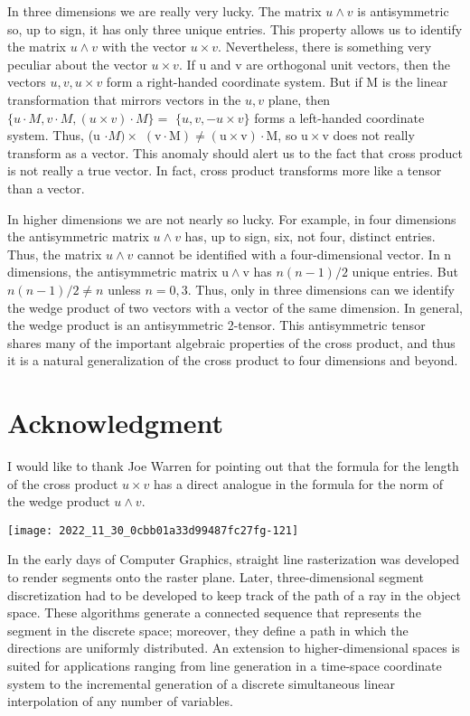 \begin{CJK}{UTF8}{gbsn}
In three dimensions we are really very lucky. The matrix $u \wedge v$ is antisymmetric so, up to sign, it has only three unique entries. This property allows us to identify the matrix $u \wedge v$ with the vector $u \times v$. Nevertheless, there is something very peculiar about the vector $u \times v$. If $\mathrm{u}$ and $\mathrm{v}$ are orthogonal unit vectors, then the vectors $u, v, u \times v$ form a right-handed coordinate system. But if $\mathrm{M}$ is the linear transformation that mirrors vectors in the $u, v$ plane, then $\{u \cdot M, v \cdot M,(u \times v) \cdot M\}=$ $\{u, v,-u \times v\}$ forms a left-handed coordinate system. Thus, (u $\cdot M) \times$ $(\mathrm{v} \cdot \mathrm{M}) \neq(\mathrm{u} \times \mathrm{v}) \cdot \mathrm{M}$, so $\mathrm{u} \times \mathrm{v}$ does not really transform as a vector. This anomaly should alert us to the fact that cross product is not really a true vector. In fact, cross product transforms more like a tensor than a vector.

In higher dimensions we are not nearly so lucky. For example, in four dimensions the antisymmetric matrix $u \wedge v$ has, up to sign, six, not four, distinct entries. Thus, the matrix $u \wedge v$ cannot be identified with a four-dimensional vector. In $\mathrm{n}$ dimensions, the antisymmetric matrix $\mathrm{u} \wedge \mathrm{v}$ has $n(n-1) / 2$ unique entries. But $n(n-1) / 2 \neq n$ unless $n=0,3$. Thus, only in three dimensions can we identify the wedge product of two vectors with a vector of the same dimension. In general, the wedge product is an antisymmetric 2-tensor. This antisymmetric tensor shares many of the important algebraic properties of the cross product, and thus it is a natural generalization of the cross product to four dimensions and beyond.

\section{Acknowledgment}
I would like to thank Joe Warren for pointing out that the formula for the length of the cross product $u \times v$ has a direct analogue in the formula for the norm of the wedge product $u \wedge v$.


\begin{center}
\texttt{[image: 2022\_11\_30\_0cbb01a33d99487fc27fg-121]}
\end{center}

In the early days of Computer Graphics, straight line rasterization was developed to render segments onto the raster plane. Later, three-dimensional segment discretization had to be developed to keep track of the path of a ray in the object space. These algorithms generate a connected sequence that represents the segment in the discrete space; moreover, they define a path in which the directions are uniformly distributed. An extension to higher-dimensional spaces is suited for applications ranging from line generation in a time-space coordinate system to the incremental generation of a discrete simultaneous linear interpolation of any number of variables.


\end{CJK}
